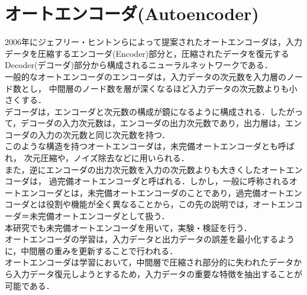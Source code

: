 \section{オートエンコーダ(Autoencoder)}
2006年にジェフリー・ヒントンらによって提案された\cite{autoencoder}オートエンコーダは，入力データを圧縮するエンコーダ(Encoder)部分と，圧縮されたデータを復元するDecoder(デコーダ)部分から構成されるニューラルネットワークである．\cite{unsupervised} \\
一般的なオートエンコーダのエンコーダは，入力データの次元数を入力層のノード数とし，
中間層のノード数を層が深くなるほど入力データの次元数よりも小さくする．\\
デコーダは，エンコーダと次元数の構成が鏡になるように構成される．したがって，デコーダの入力次元数は，エンコーダの出力次元数であり，出力層は，エンコーダの入力の次元数と同じ次元数を持つ．\\
このような構造を持つオートエンコーダは，未完備オートエンコーダとも呼ばれ，
次元圧縮や，ノイズ除去などに用いられる．\\
また，逆にエンコーダの出力次元数を入力の次元数よりも大きくしたオートエンコーダは，
過完備オートエンコーダと呼ばれる．しかし，一般に呼称されるオートエンコーダとは，未完備オートエンコーダのことであり，過完備オートエンコーダとは役割や機能が全く異なることから，この先の説明では，オートエンコーダ＝未完備オートエンコーダとして扱う．\\
本研究でも未完備オートエンコーダを用いて，実験・検証を行う．\\

オートエンコーダの学習は，入力データと出力データの誤差を最小化するように，中間層の重みを更新することで行われる．\\

オートエンコーダは学習において，中間層で圧縮され部分的に失われたデータから入力データ復元しようとするため，入力データの重要な特徴を抽出することが可能である．\\


